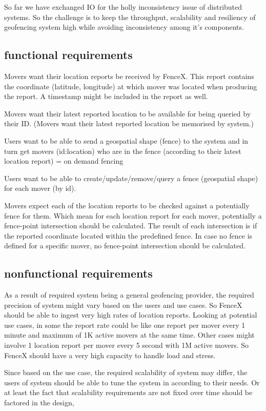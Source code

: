 \documentclass[a4]{report}
\begin{document}
    So far we have exchanged IO for the holly inconsistency issue of distributed systems. So the challenge is to keep the throughput, scalability and resiliency of geofencing system high while avoiding inconsistency among it's components.

    \subsection{functional requirements}
    Movers want their location reports be received by FenceX. This report contains the coordinate (latitude, longitude) at which mover was located when producing the report. A timestamp might be included in the report as well.

    Movers want their latest reported location to be available for being queried by their ID. (Movers want their latest reported location be memorised by system.)

    Users want to be able to send a geospatial shape (fence) to the system and in turn get movers (id:location) who are in the fence (according to their latest location report) = on demand fencing

    Users want to be able to create/update/remove/query a fence (geospatial shape) for each mover (by id).

    Movers expect each of the location reports to be checked against a potentially fence for them. Which mean for each location report for each mover, potentially a fence-point intersection should be
    calculated. The result of each intersection is if the reported coordinate located within the predefined fence. In case no fence is defined for a specific mover, no fence-point intersection should be calculated.


    \subsection{nonfunctional requirements}
    As a result of required system being a general geofencing provider, the required precision of system might vary based on the users and use cases. So FenceX should be able to ingest very high rates of location reports. Looking at potential use cases, in some the report rate could be like one report per mover every 1 minute and maximum of 1K active movers at the same time.
    Other cases might involve 1 location report per mover every 5 second with 1M active movers. So FenceX should have a very high capacity to handle load and stress.

    Since based on the use case, the required scalability of system may differ, the users of system should be able to tune the system in according to their needs. Or at least the fact that scalability requirements are not fixed over time should be factored in the design,
\end{document}
